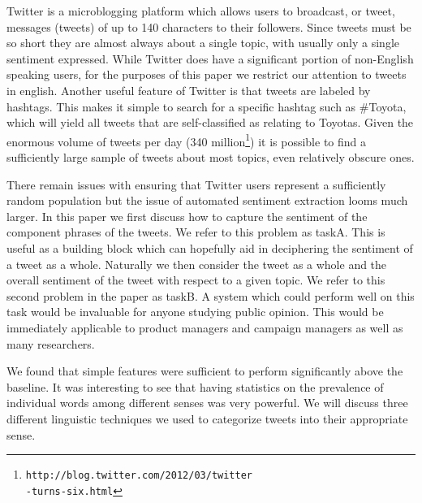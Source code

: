 \documentclass[11pt]{article}
\begin{document}
Twitter is a microblogging platform which allows users to broadcast, or tweet, messages (tweets) of up to 140 characters to their followers. Since tweets must be so short they are almost always about a single topic, with usually only a single sentiment expressed. While Twitter does have a significant portion of non-English speaking users, for the purposes of this paper we restrict our attention to tweets in english. Another useful feature of Twitter is that tweets are labeled by hashtags. This makes it simple to search for a specific hashtag such as \#Toyota, which will yield all tweets that are self-classified as relating to Toyotas. Given the enormous volume of tweets per day (340 million\footnote{{\tt http://blog.twitter.com/2012/03/twitter{\\}-turns-six.html}}) it is possible to find a sufficiently large sample of tweets about most topics, even relatively obscure ones.

There remain issues with ensuring that Twitter users represent a sufficiently random population but the issue of automated sentiment extraction looms much larger. In this paper we first discuss how to capture the sentiment of the component phrases of the tweets. We refer to this problem as taskA. This is useful as a building block which can hopefully aid in deciphering the sentiment of a tweet as a whole. Naturally we then consider the tweet as a whole and the overall sentiment of the tweet with respect to a given topic. We refer to this second problem in the paper as taskB. A system which could perform well on this task would be invaluable for anyone studying public opinion. This would be immediately applicable to product managers and campaign managers as well as many researchers.

We found that simple features were sufficient to perform significantly above the baseline. It was interesting to see that having statistics on the prevalence of individual words among different senses was very powerful. We will discuss three different linguistic techniques we used to categorize tweets into their appropriate sense.
\end{document}
